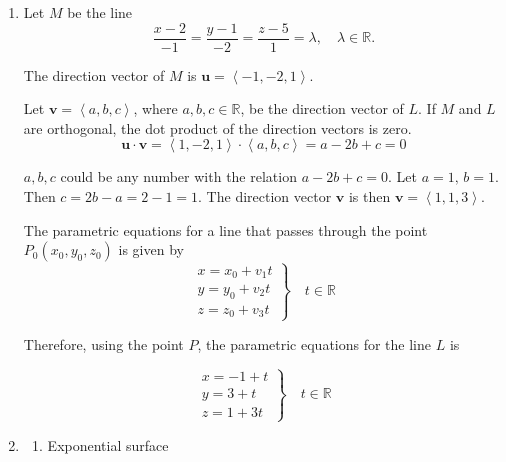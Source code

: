 \documentclass[a4paper, 12pt]{article}
\begin{document}
\begin{enumerate}[leftmargin=*,label=\textbf{\arabic*.}]

\item Let $M$ be the line
\[\dfrac{x-2}{-1}=\dfrac{y-1}{-2}=\dfrac{z-5}{1}=\lambda,\quad\lambda\in\mathbb{R}.\]

The direction vector of $M$ is $\mathbf u=\left\langle-1,-2,1\right\rangle$.

Let $\mathbf v=\left\langle a,b,c\right\rangle$, where $a,b,c\in\mathbb R$, be the direction vector of $L$. If $M$ and $L$ are orthogonal, the dot product of the direction vectors is zero.
\[\mathbf u\cdot\mathbf v=\left\langle1,-2,1\right\rangle\cdot\left\langle a,b,c\right\rangle=a-2b+c=0\]

$a,b,c$ could be any number with the relation $a-2b+c=0$. Let $a=1,\, b=1$. Then $c=2b-a=2-1=1$. The direction vector $\mathbf v$ is then $\mathbf v=\left\langle1,1,3\right\rangle$.

The parametric equations for a line that passes through the point $P_0(x_0,y_0,z_0)$ is given by
\[\left.\begin{array}{c}
x=x_0+v_1t\\
y=y_0+v_2t\\
z=z_0+v_3t
\end{array}\right\}\quad t\in\mathbb{R}\]

Therefore, using the point $P$, the parametric equations for the line $L$ is

\[\boxed{\left.\begin{array}{l}
x=-1+t\\
y=3+t\\
z=1+3t
\end{array}\right\}\quad t\in\mathbb{R}}\]

\item \begin{enumerate}[leftmargin=*,label=\textbf{\alph*.}]
\item Exponential surface
\begin{center}
\end{center}


\end{enumerate}
\end{enumerate}
\end{document}
